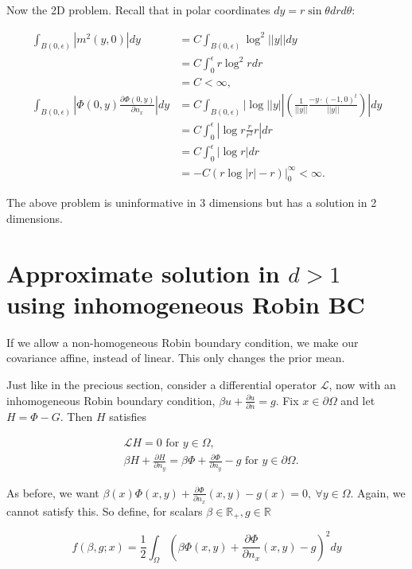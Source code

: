 \documentclass[paper=a4, fontsize=11pt]{scrartcl} %
\numberwithin{equation}{section} %
\numberwithin{figure}{section} %
\numberwithin{table}{section} %
\newcommand{\Op}{\mathcal{L}}
\begin{document}
Now the 2D problem. Recall that in polar coordinates $dy = r\sin \theta dr d\theta$:

\begin{align*}
     \int_{B(0,\epsilon)} |m^2(y,0)|dy &= C \int_{B(0,\epsilon)} \log^2||y|| dy \\
    &= C \int_{0}^{\epsilon} r \log^2 r dr \\
    &= C < \infty, \\
    \int_{B(0,\epsilon)} |\Phi(0,y) \frac{\partial \Phi(0,y)}{\partial n_x}| dy &= C \int_{B(0,\epsilon)} |\log||y|| (\frac{1}{||y||} \frac{-y\cdot (-1,0)^t}{||y||})| dy\\
    &= C\int_{0}^{\epsilon} |\log r\frac{r }{r^2}r| dr\\
    &= C \int_{0}^{\epsilon} |\log r| dr \\
    &= -C(r \log |r| - r)|_{0}^{\infty} < \infty.
\end{align*}

The above problem is uninformative in 3 dimensions but has a solution in 2 dimensions.

\section{Approximate solution in $d >1$ using inhomogeneous Robin BC}
If we allow a non-homogeneous Robin boundary condition, we make our covariance 
affine, instead of linear. This only changes the prior mean.

Just like in the precious section, consider a differential
 operator $\Op$, now with an inhomogeneous Robin boundary condition,
$ \beta u + \frac{\partial u}{\partial n} = g$. Fix $x\in \partial \Omega$ 
and let $H = \Phi - G$. Then $H$ satisfies

\begin{align*}
  &\Op H = 0 \text{ for } y \in  \Omega, \\
  &\beta H + \frac{\partial H}{\partial n_{y}} =  \beta\Phi  + \frac{\partial \Phi}{\partial n_{y}} - g  \text{ for } y \in \partial \Omega. 
\end{align*}

As before, we want $\beta(x) \Phi(x,y) + \frac{\partial \Phi}{\partial n_{x}}(x,y) - g(x) =0, \ \forall y \in \Omega$.
Again, we cannot satisfy this. So define, for scalars $\beta \in \mathbb{R}_{+},g\in \mathbb{R}$

$$
f(\beta, g;x) =\frac{1}{2} \int_{\Omega} ( \beta \Phi(x,y) + \frac{\partial \Phi}{\partial n_{x}}(x,y) - g)^{2} dy
$$
\end{document}
